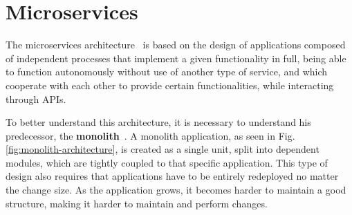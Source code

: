 \section{Microservices}
\label{s:microservices}

The microservices architecture~\cite{microservice-patterns} is based on the design of applications composed of independent processes that implement a given functionality in full, being able to function autonomously without use of another type of service, and which cooperate with each other to provide certain functionalities, while interacting through APIs.

To better understand this architecture, it is necessary to understand his predecessor, the \textbf{monolith}~\cite{monolithic-architecture}. A monolith application, as seen in Fig. \ref{fig:monolith-architecture}, is created as a single unit, split into dependent modules, which are tightly coupled to that specific application. This type of design also requires that applications have to be entirely redeployed no matter the change size. As the application grows, it becomes harder to maintain a good structure, making it harder to maintain and perform changes. 

